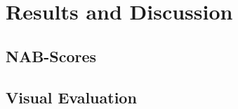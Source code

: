 \section{Results and Discussion}\label{sect:results-and-discussion}
\blindtext[1]

\subsection{NAB-Scores}
\blindtext[3]

\subsection{Visual Evaluation}
\blindtext[3]
